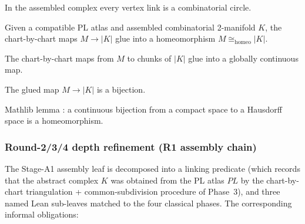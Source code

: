 \begin{lemma}
\label{lem:rado-vertex-link-is-circle}
In the assembled complex every vertex link is a combinatorial circle.
\leanok
\end{lemma}

\begin{lemma}
\label{lem:rado-realisation-homeomorphism}
Given a compatible PL atlas and assembled combinatorial 2-manifold $K$, the chart-by-chart maps $M \to |K|$ glue into a homeomorphism $M \cong_{\mathrm{homeo}} |K|$.
\leanok
\end{lemma}

\begin{lemma}
\label{lem:rado-glue-continuous}
The chart-by-chart maps from $M$ to chunks of $|K|$ glue into a globally continuous map.
\leanok
\end{lemma}

\begin{lemma}
\label{lem:rado-glue-bijective}
The glued map $M \to |K|$ is a bijection.
\leanok
\end{lemma}

\begin{lemma}
\label{lem:rado-promote-compact-T2}
Mathlib lemma : a continuous bijection from a compact space to a Hausdorff space is a homeomorphism.
\mathlibok
\end{lemma}

\subsubsection*{Round-2/3/4 depth refinement (R1 assembly chain)}

The Stage-A1 assembly leaf
 is decomposed
into a linking predicate  (which records that the
abstract complex \(K\) was obtained from the PL atlas \(PL\) by the
chart-by-chart triangulation + common-subdivision procedure of
Phase~3), and three named Lean sub-leaves matched to the four classical
phases.  The corresponding informal obligations:

